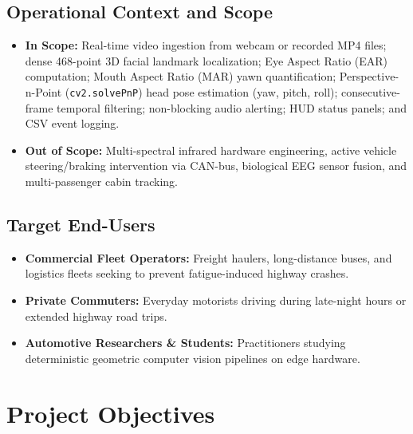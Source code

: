 \documentclass[11pt,a4paper]{article}
\begin{document}
\subsection{Operational Context and Scope}
\begin{itemize}
    \item \textbf{In Scope:} Real-time video ingestion from webcam or recorded MP4 files; dense 468-point 3D facial landmark localization; Eye Aspect Ratio (EAR) computation; Mouth Aspect Ratio (MAR) yawn quantification; Perspective-n-Point (\texttt{cv2.solvePnP}) head pose estimation (yaw, pitch, roll); consecutive-frame temporal filtering; non-blocking audio alerting; HUD status panels; and CSV event logging.
    \item \textbf{Out of Scope:} Multi-spectral infrared hardware engineering, active vehicle steering/braking intervention via CAN-bus, biological EEG sensor fusion, and multi-passenger cabin tracking.
\end{itemize}

\subsection{Target End-Users}
\begin{itemize}
    \item \textbf{Commercial Fleet Operators:} Freight haulers, long-distance buses, and logistics fleets seeking to prevent fatigue-induced highway crashes.
    \item \textbf{Private Commuters:} Everyday motorists driving during late-night hours or extended highway road trips.
    \item \textbf{Automotive Researchers \& Students:} Practitioners studying deterministic geometric computer vision pipelines on edge hardware.
\end{itemize}

\newpage
\section{Project Objectives}
\end{document}
